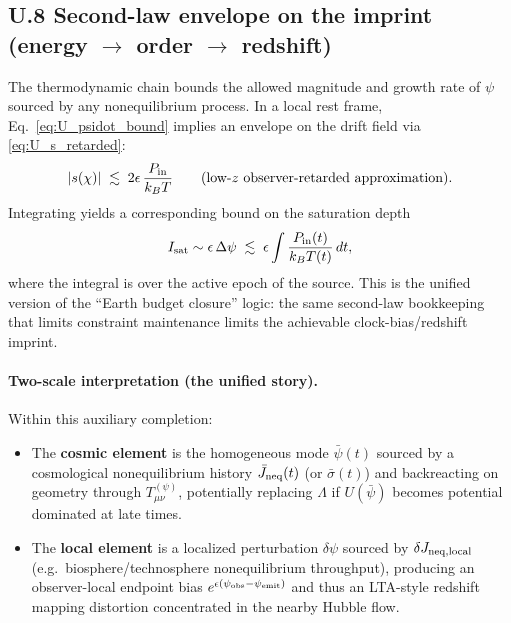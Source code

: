 \documentclass[10pt]{article}
\begin{document}
\subsection{U.8 Second-law envelope on the imprint (energy $\rightarrow$ order $\rightarrow$ redshift)}
\label{app:unified:bounds}

The thermodynamic chain bounds the allowed magnitude and growth rate of $\psi$ sourced by any nonequilibrium process.
In a local rest frame, Eq.~\eqref{eq:U_psidot_bound} implies an envelope on the drift field via \eqref{eq:U_s_retarded}:
\begin{equation}
|s(\chi)|
\;\lesssim\;
2\epsilon\,\frac{P_{\rm in}}{k_B T}
\qquad (\text{low-$z$ observer-retarded approximation}).
\label{eq:U_s_bound}
\end{equation}
Integrating yields a corresponding bound on the saturation depth
\begin{equation}
I_{\rm sat}\sim \epsilon\,\Delta\psi
\;\lesssim\;
\epsilon\int \frac{P_{\rm in}(t)}{k_B T(t)}\,dt,
\label{eq:U_Isat_bound}
\end{equation}
where the integral is over the active epoch of the source. This is the unified version of the
``Earth budget closure'' logic: the same second-law bookkeeping that limits constraint maintenance
limits the achievable clock-bias/redshift imprint.

\paragraph{Two-scale interpretation (the unified story).}
Within this auxiliary completion:
\begin{itemize}[leftmargin=1.2em]
\item The \textbf{cosmic element} is the homogeneous mode $\bar\psi(t)$ sourced by a cosmological nonequilibrium history
$\bar J_{\rm neq}(t)$ (or $\bar\sigma(t)$) and backreacting on geometry through $T^{(\psi)}_{\mu\nu}$,
potentially replacing $\Lambda$ if $U(\bar\psi)$ becomes potential dominated at late times.
\item The \textbf{local element} is a localized perturbation $\delta\psi$ sourced by $\delta J_{\rm neq,local}$
(e.g.\ biosphere/technosphere nonequilibrium throughput), producing an observer-local endpoint bias
$e^{\epsilon(\psi_{\rm obs}-\psi_{\rm emit})}$ and thus an LTA-style redshift mapping distortion concentrated in the nearby Hubble flow.
\end{itemize}
\end{document}
